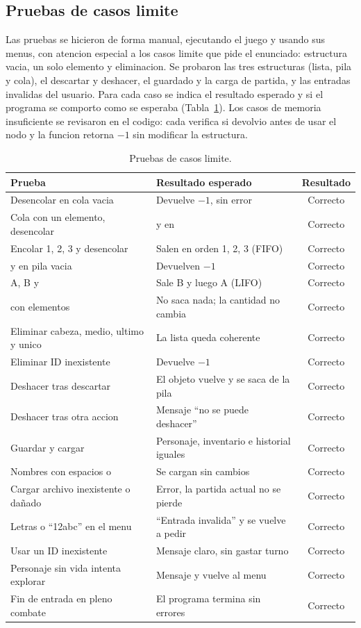 \documentclass[11pt,a4paper]{article}
\newcommand{\fn}[1]{\texttt{\detokenize{#1}}}
\begin{document}
\subsection{Pruebas de casos limite}
Las pruebas se hicieron de forma manual, ejecutando el juego y usando sus menus, con atencion especial a
los casos limite que pide el enunciado: estructura vacia, un solo elemento y eliminacion. Se probaron las
tres estructuras (lista, pila y cola), el descartar y deshacer, el guardado y la carga de partida, y las
entradas invalidas del usuario. Para cada caso se indica el resultado esperado y si el programa se
comporto como se esperaba (Tabla~\ref{tab:pruebas}). Los casos de memoria insuficiente se revisaron en el
codigo: cada \fn{malloc} verifica si devolvio \fn{NULL} antes de usar el nodo y la funcion retorna $-1$ sin
modificar la estructura.

\begin{table}[h]
\centering
\small
\begin{tabularx}{\textwidth}{l X c}
\toprule
\textbf{Prueba} & \textbf{Resultado esperado} & \textbf{Resultado} \\
\midrule
Desencolar en cola vacia & Devuelve $-1$, sin error & Correcto \\
Cola con un elemento, desencolar & \fn{frente} y \fn{final} en \fn{NULL} & Correcto \\
Encolar 1, 2, 3 y desencolar & Salen en orden 1, 2, 3 (FIFO) & Correcto \\
\fn{pop} y \fn{peek} en pila vacia & Devuelven $-1$ & Correcto \\
\fn{push} A, B y \fn{pop} & Sale B y luego A (LIFO) & Correcto \\
\fn{peek} con elementos & No saca nada; la cantidad no cambia & Correcto \\
Eliminar cabeza, medio, ultimo y unico & La lista queda coherente & Correcto \\
Eliminar ID inexistente & Devuelve $-1$ & Correcto \\
Deshacer tras descartar & El objeto vuelve y se saca de la pila & Correcto \\
Deshacer tras otra accion & Mensaje ``no se puede deshacer'' & Correcto \\
Guardar y cargar & Personaje, inventario e historial iguales & Correcto \\
Nombres con espacios o \fn{\_} & Se cargan sin cambios & Correcto \\
Cargar archivo inexistente o dañado & Error, la partida actual no se pierde & Correcto \\
Letras o ``12abc'' en el menu & ``Entrada invalida'' y se vuelve a pedir & Correcto \\
Usar un ID inexistente & Mensaje claro, sin gastar turno & Correcto \\
Personaje sin vida intenta explorar & Mensaje y vuelve al menu & Correcto \\
Fin de entrada en pleno combate & El programa termina sin errores & Correcto \\
\bottomrule
\end{tabularx}
\caption{Pruebas de casos limite.}
\label{tab:pruebas}
\end{table}
\end{document}

